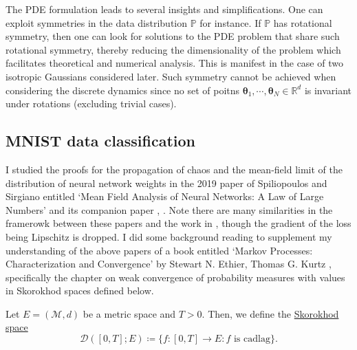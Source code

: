 \documentclass{article}
\theoremstyle{mystyle}
\newcommand{\R}{\ensuremath{\mathbb{R}}}
\newcommand{\PP}{\ensuremath{\mathbb{P}}}
\begin{document}
The PDE formulation leads to several insights and simplifications. One can exploit symmetries in the data distribution $ \PP$ for instance. If $ \PP$ has rotational symmetry, then one can look for solutions to the PDE problem that share such rotational symmetry, thereby reducing the dimensionality of the problem which facilitates theoretical and numerical analysis. This is manifest in the case of two isotropic Gaussians considered later. Such symmetry cannot be achieved when considering the discrete dynamics since no set of poitns $ \mathbf{\theta}_{1}, \cdots, \mathbf{\theta}_{N}\in \R^{d}$ is invariant under rotations (excluding trivial cases).

\newpage
\subsection{MNIST data classification}\label{sec: MNIST classification}

I studied the proofs for the propagation of chaos and the mean-field limit of the distribution of neural network weights in the 2019 paper of Spiliopoulos and Sirgiano entitled ‘Mean Field Analysis of Neural Networks: A Law of Large Numbers’ and its companion paper \cite{sirignano2019meanfieldanalysislln}, \cite{sirignano2019meanfieldanalysisclt}. Note there are many similarities in the framerowk between these papers and the work in \cite{Mei_2018}, though the gradient of the loss being Lipschitz is dropped. I did some background reading to supplement my understanding of the above papers of a book entitled ‘Markov Processes: Characterization and Convergence’ by Stewart N. Ethier, Thomas G. Kurtz \cite{ethier2009markov}, specifically the chapter on weak convergence of probability measures with values in Skorokhod spaces defined below.

\begin{boxdef}\label{def: skorokhod}
	Let $  E = (\mathcal{M}, d)$ be a metric space and $ T>0$. Then, we define the \underline{Skorokhod space} 
\begin{equation}
	\mathcal{D}([0,T]; E) \coloneqq \{f:[0,T]\to E: f \text{ is cadlag}\}.
\end{equation}

\end{boxdef}
\end{document}

